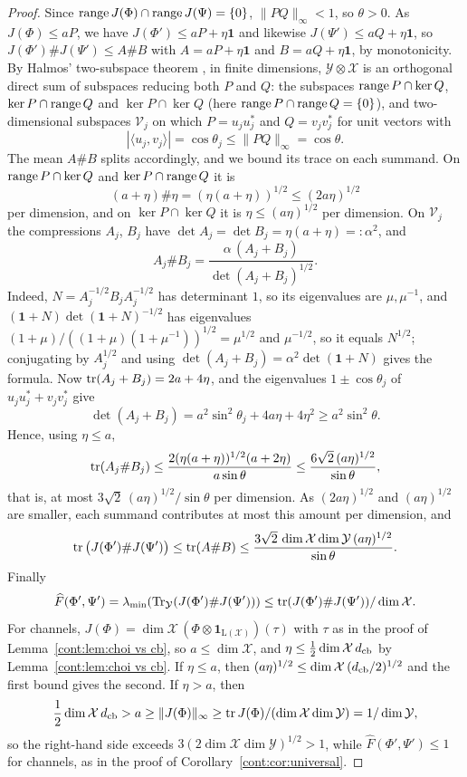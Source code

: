 \begin{proof}
Since $\operatorname{range} J(\Phi)\cap\operatorname{range} J(\Psi)=\{0\}$, $\|PQ\|_\infty<1$, so $\theta>0$. As $J(\Phi)\leq aP$, we have $J(\Phi')\leq aP+\eta\mathbf{1}$ and likewise $J(\Psi')\leq aQ+\eta\mathbf{1}$, so $J(\Phi')\#J(\Psi')\leq A\#B$ with $A=aP+\eta\mathbf{1}$ and $B=aQ+\eta\mathbf{1}$, by monotonicity. By Halmos' two-subspace theorem \cite{Halmos1969}, in finite dimensions, $\mathcal{Y}\otimes\mathcal{X}$ is an orthogonal direct sum of subspaces reducing both $P$ and $Q$: the subspaces $\operatorname{range} P\cap\ker Q$, $\ker P\cap\operatorname{range} Q$ and $\ker P\cap\ker Q$ (here $\operatorname{range} P\cap\operatorname{range} Q=\{0\}$), and two-dimensional subspaces $\mathcal{V}_j$ on which $P=u_ju_j^*$ and $Q=v_jv_j^*$ for unit vectors with
\[
|\langle u_j,v_j\rangle|=\cos\theta_j\leq\|PQ\|_\infty=\cos\theta.
\]
The mean $A\#B$ splits accordingly, and we bound its trace on each summand. On $\operatorname{range} P\cap\ker Q$ and $\ker P\cap\operatorname{range} Q$ it is
\[
(a+\eta)\#\eta=(\eta(a+\eta))^{1/2}\leq(2a\eta)^{1/2}
\]
per dimension, and on $\ker P\cap\ker Q$ it is $\eta\leq(a\eta)^{1/2}$ per dimension. On $\mathcal{V}_j$ the compressions $A_j$, $B_j$ have $\det A_j=\det B_j=\eta(a+\eta)=:\alpha^2$, and
\[
A_j\#B_j=\frac{\alpha\,(A_j+B_j)}{\det(A_j+B_j)^{1/2}} .
\]
Indeed, $N=A_j^{-1/2}B_jA_j^{-1/2}$ has determinant $1$, so its eigenvalues are $\mu,\mu^{-1}$, and $(\mathbf{1}+N)\det(\mathbf{1}+N)^{-1/2}$ has eigenvalues $(1+\mu)/((1+\mu)(1+\mu^{-1}))^{1/2}=\mu^{1/2}$ and $\mu^{-1/2}$, so it equals $N^{1/2}$; conjugating by $A_j^{1/2}$ and using $\det(A_j+B_j)=\alpha^2\det(\mathbf{1}+N)$ gives the formula. Now $\operatorname{tr}(A_j+B_j)=2a+4\eta$, and the eigenvalues $1\pm\cos\theta_j$ of $u_ju_j^*+v_jv_j^*$ give
\[
\det(A_j+B_j)=a^2\sin^2\theta_j+4a\eta+4\eta^2\geq a^2\sin^2\theta.
\]
Hence, using $\eta\leq a$,
\[
\operatorname{tr}(A_j\#B_j)\leq\frac{2(\eta(a+\eta))^{1/2}(a+2\eta)}{a\sin\theta}\leq\frac{6\sqrt2\,(a\eta)^{1/2}}{\sin\theta},
\]
that is, at most $3\sqrt2\,(a\eta)^{1/2}/\sin\theta$ per dimension. As $(2a\eta)^{1/2}$ and $(a\eta)^{1/2}$ are smaller, each summand contributes at most this amount per dimension, and
\[
\operatorname{tr}\big(J(\Phi')\#J(\Psi')\big)\leq\operatorname{tr}(A\#B)\leq\frac{3\sqrt2\,\dim\mathcal{X}\dim\mathcal{Y}\,(a\eta)^{1/2}}{\sin\theta}.
\]
Finally
\[
\widehat{F}(\Phi',\Psi')=\lambda_{\min}(\operatorname{Tr}_{\mathcal{Y}}(J(\Phi')\#J(\Psi')))\leq\operatorname{tr}(J(\Phi')\#J(\Psi'))/\dim\mathcal{X}.
\]
For channels, $J(\Phi)=\dim\mathcal{X}\,(\Phi\otimes\mathbf{1}_{\mathrm{L}(\mathcal{X})})(\tau)$ with $\tau$ as in the proof of Lemma~\ref{cont:lem:choi vs cb}, so $a\leq\dim\mathcal{X}$, and $\eta\leq\frac12\dim\mathcal{X}\,d_{\rm cb}$ by Lemma~\ref{cont:lem:choi vs cb}. If $\eta\leq a$, then $(a\eta)^{1/2}\leq\dim\mathcal{X}\,(d_{\rm cb}/2)^{1/2}$ and the first bound gives the second. If $\eta>a$, then
\[
\frac12\dim\mathcal{X}\,d_{\rm cb}>a\geq\|J(\Phi)\|_\infty\geq\operatorname{tr} J(\Phi)/(\dim\mathcal{X}\dim\mathcal{Y})=1/\dim\mathcal{Y},
\]
so the right-hand side exceeds $3(2\dim\mathcal{X}\dim\mathcal{Y})^{1/2}>1$, while $\widehat{F}(\Phi',\Psi')\leq1$ for channels, as in the proof of Corollary~\ref{cont:cor:universal}.
\end{proof}

